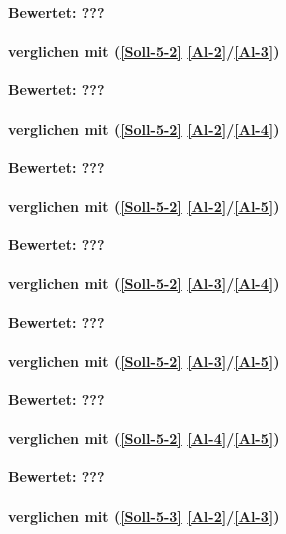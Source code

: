 \textbf{Bewertet: ???}


\paragraph*{  verglichen mit  (\ref{Soll-5-2} \ref{Al-2}/\ref{Al-3})}

\textbf{Bewertet: ???}

\paragraph*{  verglichen mit  (\ref{Soll-5-2} \ref{Al-2}/\ref{Al-4})}

\textbf{Bewertet: ???}

\paragraph*{  verglichen mit  (\ref{Soll-5-2} \ref{Al-2}/\ref{Al-5})}

\textbf{Bewertet: ???}

\paragraph*{  verglichen mit  (\ref{Soll-5-2} \ref{Al-3}/\ref{Al-4})}

\textbf{Bewertet: ???}

\paragraph*{  verglichen mit  (\ref{Soll-5-2} \ref{Al-3}/\ref{Al-5})}

\textbf{Bewertet: ???}


\paragraph*{  verglichen mit  (\ref{Soll-5-2} \ref{Al-4}/\ref{Al-5})}

\textbf{Bewertet: ???}


\paragraph*{  verglichen mit  (\ref{Soll-5-3} \ref{Al-2}/\ref{Al-3})}


